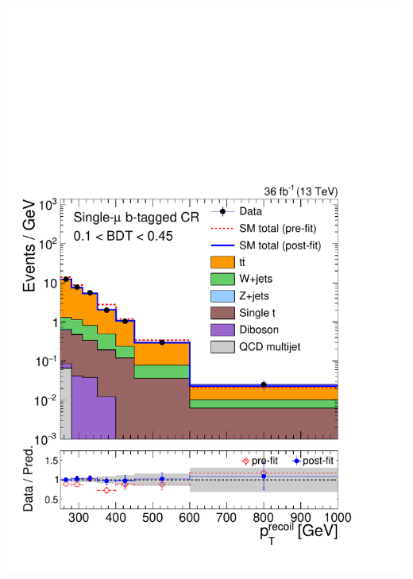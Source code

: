\documentclass[aspectratio=169,xcolor=dvipsnames,,table,compress]{beamer}
\begin{document}
\begin{frame}[t]
\begin{columns}[T]
\begin{column}{0.125\textwidth}
      \includegraphics[width=\textwidth]{../figures/monotop/postfit/stackedPostfit_singlemuontop_monotop_loose.pdf}\\ 

\end{column}
\end{columns}
\end{frame}
\end{document}
